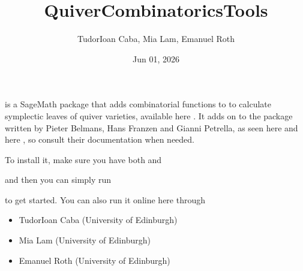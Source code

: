 \documentclass[letterpaper,10pt,english]{sphinxmanual}
\title{QuiverCombinatoricsTools}
\date{Jun 01, 2026}
\author{Tudor\sphinxhyphen{}Ioan Caba, Mia Lam, Emanuel Roth}
\begin{document}
\pagestyle{empty}
\sphinxmaketitle
\pagestyle{plain}
\sphinxtableofcontents
\pagestyle{normal}
\label{\detokenize{index::doc}}


\sphinxAtStartPar
{} is a SageMath package that adds combinatorial functions to  to calculate symplectic leaves of quiver varieties, available here . It adds on to the  package written by Pieter Belmans, Hans Franzen and Gianni Petrella, as seen here  and here , so consult their documentation when needed.

\sphinxAtStartPar
To install it, make sure you have both  and 

\begin{sphinxVerbatim}[commandchars=\\\{\}]
   
   
\end{sphinxVerbatim}

\sphinxAtStartPar
and then you can simply run

\begin{sphinxVerbatim}[commandchars=\\\{\}]
 
 
\end{sphinxVerbatim}

\sphinxAtStartPar
to get started. You can also run it online here through 

\sphinxAtStartPar
{}
\begin{itemize}
\item {} 
\sphinxAtStartPar
Tudor\sphinxhyphen{}Ioan Caba (University of Edinburgh)

\item {} 
\sphinxAtStartPar
Mia Lam (University of Edinburgh)

\item {} 
\sphinxAtStartPar
Emanuel Roth (University of Edinburgh)

\end{itemize}
\end{document}
